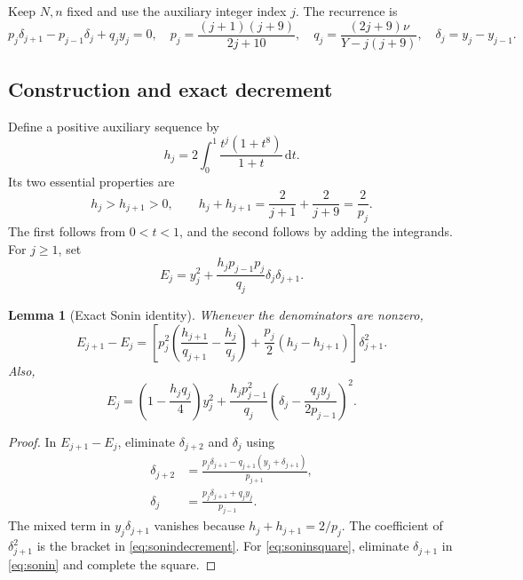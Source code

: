 \documentclass[11pt]{article}
\newtheorem{lemma}[theorem]{Lemma}
\theoremstyle{remark}
\numberwithin{equation}{section}
\newcommand{\dd}{\mathrm d}
\begin{document}
Keep $N,n$ fixed and use the auxiliary integer index $j$. The recurrence is
\begin{equation}
 p_j\delta_{j+1}-p_{j-1}\delta_j+q_jy_j=0,
 \quad
 p_j=\frac{(j+1)(j+9)}{2j+10},\quad
 q_j=\frac{(2j+9)\nu}{Y-j(j+9)},\quad
 \delta_j=y_j-y_{j-1}.
 \label{eq:b4rec}
\end{equation}

\subsection{Construction and exact decrement}

Define a positive auxiliary sequence by
\begin{equation}
 h_j=2\int_0^1\frac{t^j(1+t^8)}{1+t}\,\dd t.
 \label{eq:hj}
\end{equation}
Its two essential properties are
\begin{equation}
 h_j>h_{j+1}>0,\qquad
 h_j+h_{j+1}=\frac2{j+1}+\frac2{j+9}=\frac2{p_j}.
 \label{eq:hidentity}
\end{equation}
The first follows from $0<t<1$, and the second follows by adding the
integrands. For $j\ge1$, set
\begin{equation}
 E_j=y_j^2+\frac{h_jp_{j-1}p_j}{q_j}\delta_j\delta_{j+1}.
 \label{eq:sonin}
\end{equation}

\begin{lemma}[Exact Sonin identity]
\label{lem:sonin}
Whenever the denominators are nonzero,
\begin{equation}
 E_{j+1}-E_j=
 \left[
 p_j^2\left(\frac{h_{j+1}}{q_{j+1}}-\frac{h_j}{q_j}\right)
 +\frac{p_j}{2}(h_j-h_{j+1})
 \right]\delta_{j+1}^2.
 \label{eq:sonindecrement}
\end{equation}
Also,
\begin{equation}
 E_j=\left(1-\frac{h_jq_j}{4}\right)y_j^2
 +\frac{h_jp_{j-1}^2}{q_j}
       \left(\delta_j-\frac{q_jy_j}{2p_{j-1}}\right)^2.
 \label{eq:soninsquare}
\end{equation}
\end{lemma}

\begin{proof}
In $E_{j+1}-E_j$, eliminate $\delta_{j+2}$ and $\delta_j$ using
\begin{align*}
 \delta_{j+2}&=\frac{p_j\delta_{j+1}-q_{j+1}(y_j+\delta_{j+1})}{p_{j+1}},\\
 \delta_j&=\frac{p_j\delta_{j+1}+q_jy_j}{p_{j-1}}.
\end{align*}
The mixed term in $y_j\delta_{j+1}$ vanishes because
$h_j+h_{j+1}=2/p_j$. The coefficient of $\delta_{j+1}^2$ is the bracket
in \eqref{eq:sonindecrement}. For \eqref{eq:soninsquare}, eliminate
$\delta_{j+1}$ in \eqref{eq:sonin} and complete the square.
\end{proof}
\end{document}

